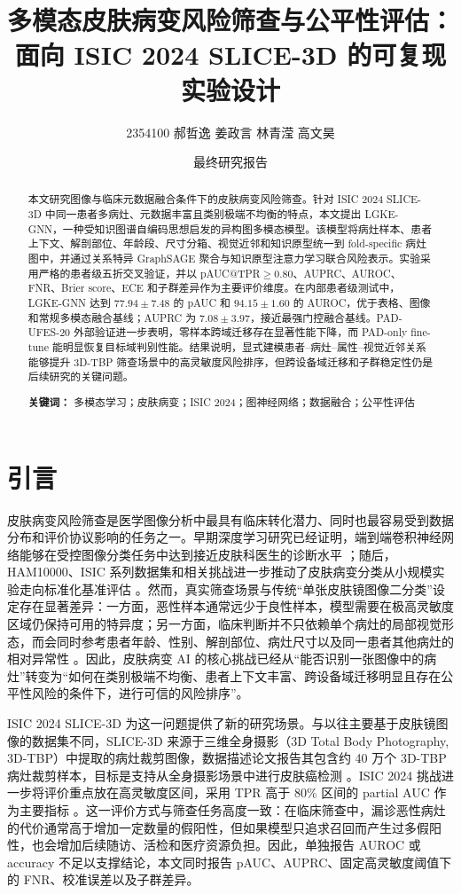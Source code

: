 \documentclass[UTF8,a4paper,10pt,twocolumn,fontset=fandol]{ctexart}
\title{\vspace{-1.2em}\textbf{多模态皮肤病变风险筛查与公平性评估：\\面向 ISIC 2024 SLICE-3D 的可复现实验设计}}
\author{\small
2354100 郝哲逸 \quad
2353594 姜政言 \quad
2354356 林青滢 \quad
2353833 高文昊
}
\date{\small 最终研究报告}
\newcommand{\modelname}{LGKE-GNN}
\begin{document}
\maketitle
\vspace{-1.2em}

\begin{abstract}
本文研究图像与临床元数据融合条件下的皮肤病变风险筛查。针对 ISIC 2024 SLICE-3D 中同一患者多病灶、元数据丰富且类别极端不均衡的特点，本文提出 \modelname{}，一种受知识图谱自编码思想启发的异构图多模态模型。该模型将病灶样本、患者上下文、解剖部位、年龄段、尺寸分箱、视觉近邻和知识原型统一到 fold-specific 病灶图中，并通过关系特异 GraphSAGE 聚合与知识原型注意力学习联合风险表示。实验采用严格的患者级五折交叉验证，并以 pAUC@TPR$\geq0.80$、AUPRC、AUROC、FNR、Brier score、ECE 和子群差异作为主要评价维度。在内部患者级测试中，\modelname{} 达到 $77.94\pm7.48$ 的 pAUC 和 $94.15\pm1.60$ 的 AUROC，优于表格、图像和常规多模态融合基线；AUPRC 为 $7.08\pm3.97$，接近最强门控融合基线。PAD-UFES-20 外部验证进一步表明，零样本跨域迁移存在显著性能下降，而 PAD-only fine-tune 能明显恢复目标域判别性能。结果说明，显式建模患者--病灶--属性--视觉近邻关系能够提升 3D-TBP 筛查场景中的高灵敏度风险排序，但跨设备域迁移和子群稳定性仍是后续研究的关键问题。

\textbf{关键词：} 多模态学习；皮肤病变；ISIC 2024；图神经网络；数据融合；公平性评估
\end{abstract}

\section{引言}

皮肤病变风险筛查是医学图像分析中最具有临床转化潜力、同时也最容易受到数据分布和评价协议影响的任务之一。早期深度学习研究已经证明，端到端卷积神经网络能够在受控图像分类任务中达到接近皮肤科医生的诊断水平 \cite{esteva2017dermatologist}；随后，HAM10000、ISIC 系列数据集和相关挑战进一步推动了皮肤病变分类从小规模实验走向标准化基准评估 \cite{tschandl2018ham10000,cassidy2022isic}。然而，真实筛查场景与传统“单张皮肤镜图像二分类”设定存在显著差异：一方面，恶性样本通常远少于良性样本，模型需要在极高灵敏度区域仍保持可用的特异度；另一方面，临床判断并不只依赖单个病灶的局部视觉形态，而会同时参考患者年龄、性别、解剖部位、病灶尺寸以及同一患者其他病灶的相对异常性 \cite{rotemberg2021patient}。因此，皮肤病变 AI 的核心挑战已经从“能否识别一张图像中的病灶”转变为“如何在类别极端不均衡、患者上下文丰富、跨设备域迁移明显且存在公平性风险的条件下，进行可信的风险排序”。

ISIC 2024 SLICE-3D 为这一问题提供了新的研究场景。与以往主要基于皮肤镜图像的数据集不同，SLICE-3D 来源于三维全身摄影（3D Total Body Photography, 3D-TBP）中提取的病灶裁剪图像，数据描述论文报告其包含约 40 万个 3D-TBP 病灶裁剪样本，目标是支持从全身摄影场景中进行皮肤癌检测 \cite{kurtansky2024slice3d}。ISIC 2024 挑战进一步将评价重点放在高灵敏度区间，采用 TPR 高于 80\% 区间的 partial AUC 作为主要指标 \cite{isic2024challenge}。这一评价方式与筛查任务高度一致：在临床筛查中，漏诊恶性病灶的代价通常高于增加一定数量的假阳性，但如果模型只追求召回而产生过多假阳性，也会增加后续随访、活检和医疗资源负担。因此，单独报告 AUROC 或 accuracy 不足以支撑结论，本文同时报告 pAUC、AUPRC、固定高灵敏度阈值下的 FNR、校准误差以及子群差异。
\end{document}
